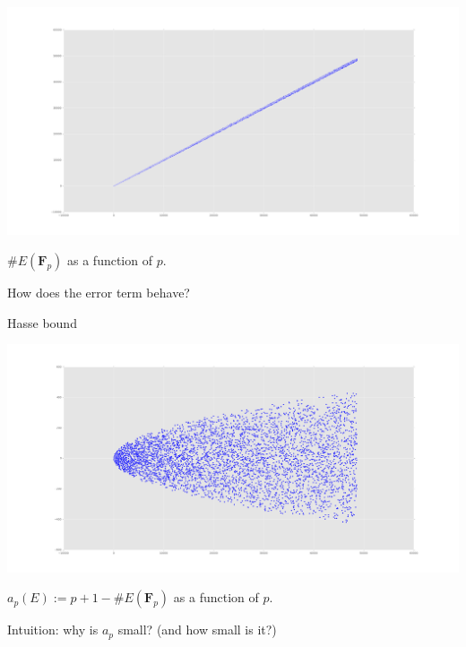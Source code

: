 \documentclass{beamer}
\newcommand{\bF}{\mathbf{F}}
\begin{document}
\begin{frame}
\begin{center}
\includegraphics[width=\textwidth]{rank2_point_counts}

$\# E(\bF_p)$ as a function of $p$.
\end{center}
\pause

How does the error term behave?
\end{frame}

\begin{frame}{Hasse bound}
\begin{center}
\includegraphics[width=\textwidth]{rank2_trace_Frobenius}

$a_p(E):=p+1-\# E(\bF_p)$ as a function of $p$.
\end{center}

\pause
Intuition: why is $a_p$ small? (and how small is it?)
\end{frame}
\end{document}
